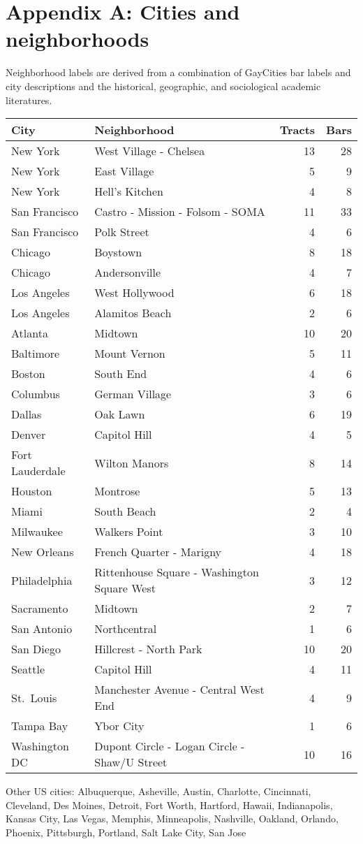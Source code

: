 
\newpage

\setlength\parindent{0cm} \setlength{\parskip}{0.5em}
\setlength\leftskip{0cm} \linespread{1}\selectfont

\section{Appendix A: Cities and
neighborhoods}\label{appendix-a-cities-and-neighborhoods}

Neighborhood labels are derived from a combination of GayCities bar
labels and city descriptions and the historical, geographic, and
sociological academic literatures.

\begin{longtable}[]{@{}llrr@{}}
\toprule
City & Neighborhood & Tracts & Bars\tabularnewline
\midrule
\endhead
New York & West Village - Chelsea & 13 & 28\tabularnewline
New York & East Village & 5 & 9\tabularnewline
New York & Hell's Kitchen & 4 & 8\tabularnewline
San Francisco & Castro - Mission - Folsom - SOMA & 11 &
33\tabularnewline
San Francisco & Polk Street & 4 & 6\tabularnewline
Chicago & Boystown & 8 & 18\tabularnewline
Chicago & Andersonville & 4 & 7\tabularnewline
Los Angeles & West Hollywood & 6 & 18\tabularnewline
Los Angeles & Alamitos Beach & 2 & 6\tabularnewline
Atlanta & Midtown & 10 & 20\tabularnewline
Baltimore & Mount Vernon & 5 & 11\tabularnewline
Boston & South End & 4 & 6\tabularnewline
Columbus & German Village & 3 & 6\tabularnewline
Dallas & Oak Lawn & 6 & 19\tabularnewline
Denver & Capitol Hill & 4 & 5\tabularnewline
Fort Lauderdale & Wilton Manors & 8 & 14\tabularnewline
Houston & Montrose & 5 & 13\tabularnewline
Miami & South Beach & 2 & 4\tabularnewline
Milwaukee & Walkers Point & 3 & 10\tabularnewline
New Orleans & French Quarter - Marigny & 4 & 18\tabularnewline
Philadelphia & Rittenhouse Square - Washington Square West & 3 &
12\tabularnewline
Sacramento & Midtown & 2 & 7\tabularnewline
San Antonio & Northcentral & 1 & 6\tabularnewline
San Diego & Hillcrest - North Park & 10 & 20\tabularnewline
Seattle & Capitol Hill & 4 & 11\tabularnewline
St.~Louis & Manchester Avenue - Central West End & 4 & 9\tabularnewline
Tampa Bay & Ybor City & 1 & 6\tabularnewline
Washington DC & Dupont Circle - Logan Circle - Shaw/U Street & 10 &
16\tabularnewline
\bottomrule
\end{longtable}

Other US cities: Albuquerque, Asheville, Austin, Charlotte, Cincinnati,
Cleveland, Des Moines, Detroit, Fort Worth, Hartford, Hawaii,
Indianapolis, Kansas City, Las Vegas, Memphis, Minneapolis, Nashville,
Oakland, Orlando, Phoenix, Pittsburgh, Portland, Salt Lake City, San
Jose

